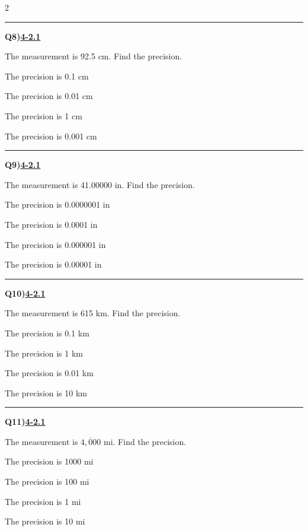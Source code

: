 \documentclass[11pt]{article}
\newenvironment{Qbox}[2]{%
  \par\medskip\noindent\begin{minipage}{\linewidth}%
  \hrule\medskip%
  \textbf{Q#1)}\hfill\textbf{\underline{#2}}\par\smallskip%
}{\par\end{minipage}\par\medskip}
\begin{document}
\begin{multicols}{2}
\begin{Qbox}{8}{4-2.1}
The measurement is 92.5 cm. Find the precision.
\begin{choices}
  \item The precision is 0.1 cm
  \item The precision is 0.01 cm
  \item The precision is 1 cm
  \item The precision is 0.001 cm
\end{choices}
\end{Qbox}

\begin{Qbox}{9}{4-2.1}
The measurement is 41.00000 in. Find the precision.
\begin{choices}
  \item The precision is 0.0000001 in
  \item The precision is 0.0001 in
  \item The precision is 0.000001 in
  \item The precision is 0.00001 in
\end{choices}
\end{Qbox}

\begin{Qbox}{10}{4-2.1}
The measurement is 615 km. Find the precision.
\begin{choices}
  \item The precision is 0.1 km
  \item The precision is 1 km
  \item The precision is 0.01 km
  \item The precision is 10 km
\end{choices}
\end{Qbox}

\begin{Qbox}{11}{4-2.1}
The measurement is $4{,}\overline{0}00$ mi. Find the precision.
\begin{choices}
  \item The precision is 1000 mi
  \item The precision is 100 mi
  \item The precision is 1 mi
  \item The precision is 10 mi
\end{choices}
\end{Qbox}


\end{multicols}
\end{document}
